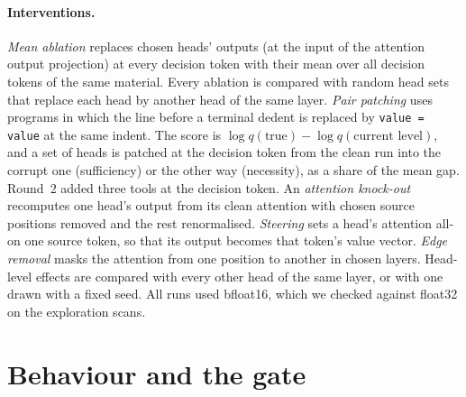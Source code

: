 \documentclass[11pt]{article}
\newcommand{\code}[1]{\texttt{#1}}
\begin{document}
\paragraph{Interventions.} \emph{Mean ablation} replaces chosen heads' outputs (at the input of the attention output projection) at every decision token with their mean over all decision tokens of the same material. Every ablation is compared with random head sets that replace each head by another head of the same layer. \emph{Pair patching} uses programs in which the line before a terminal dedent is replaced by \code{value = value} at the same indent. The score is $\log q(\text{true}) - \log q(\text{current level})$, and a set of heads is patched at the decision token from the clean run into the corrupt one (sufficiency) or the other way (necessity), as a share of the mean gap. Round~2 added three tools at the decision token. An \emph{attention knock-out} recomputes one head's output from its clean attention with chosen source positions removed and the rest renormalised. \emph{Steering} sets a head's attention all-on one source token, so that its output becomes that token's value vector. \emph{Edge removal} masks the attention from one position to another in chosen layers. Head-level effects are compared with every other head of the same layer, or with one drawn with a fixed seed. All runs used bfloat16, which we checked against float32 on the exploration scans.

\section{Behaviour and the gate}
\label{sec:gate}
\end{document}
